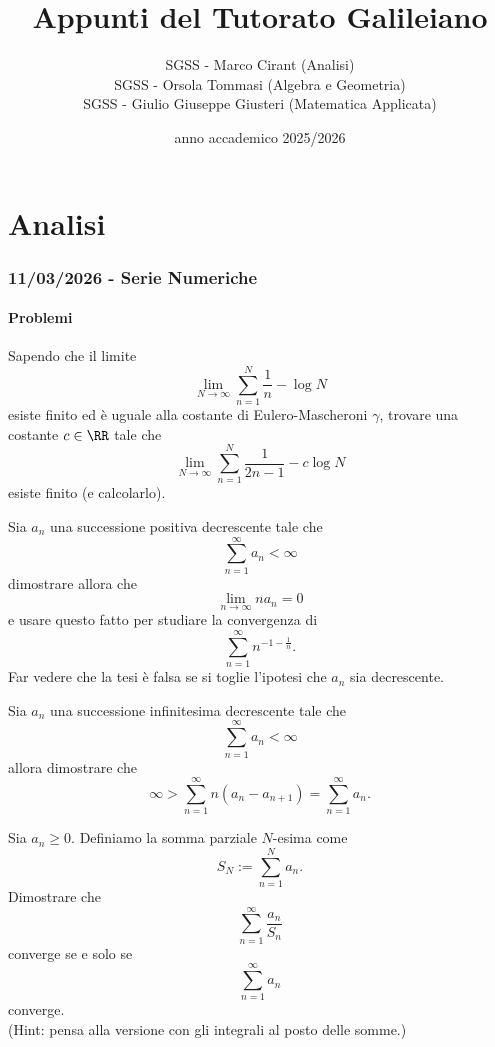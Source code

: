 \documentclass[11pt]{scrartcl}
\begin{document}
	\title{Appunti del Tutorato Galileiano}
	\subtitle{
		SGSS - Marco Cirant (Analisi)\\
		SGSS - Orsola Tommasi (Algebra e Geometria)\\
		SGSS - Giulio Giuseppe Giusteri (Matematica Applicata)
	}
	\date{anno accademico 2025/2026}
	
	\maketitle
	
	\tableofcontents
	
	\newpage
	\part{Analisi}
	\section{11/03/2026 - Serie Numeriche}
	\subsection{Problemi}
	
	\begin{problem}
		Sapendo che il limite 
		$$\lim_{N\to\infty}\sum_{n=1}^{N}\frac{1}{n}-\log N$$
		esiste finito ed è uguale alla costante di Eulero-Mascheroni $\gamma$, trovare una costante $c\in \RR$ tale che
		$$\lim_{N\to\infty}\sum_{n=1}^N\frac{1}{2n-1}-c\log N$$
		esiste finito (e calcolarlo). 
	\end{problem}
	\begin{problem}
		Sia $a_n$ una successione positiva decrescente tale che 
		$$\sum_{n=1}^\infty a_n < \infty$$
		dimostrare allora che 
		$$\lim_{n\to\infty}na_n=0$$
		e usare questo fatto per studiare la convergenza di 
		$$\sum_{n=1}^\infty n^{-1-\frac{1}{n}}.$$
		Far vedere che la tesi è falsa se si toglie l'ipotesi che $a_n$ sia decrescente.
	\end{problem}
	\begin{problem}
		Sia $a_n$ una successione infinitesima decrescente tale che 
		$$\sum_{n=1}^\infty a_n < \infty$$
		allora dimostrare che 
		$$\infty>\sum_{n=1}^\infty n(a_n-a_{n+1})=\sum_{n=1}^\infty a_n.$$ 
	\end{problem}
	\begin{problem}
		Sia $a_n\ge 0$. Definiamo la somma parziale $N$-esima come
		$$S_N:=\sum_{n=1}^N a_n.$$
		Dimostrare che 
		$$\sum_{n=1}^\infty \frac{a_n}{S_n}$$
		converge se e solo se 
		$$\sum_{n=1}^\infty a_n$$
		converge. \\
		(Hint: pensa alla versione con gli integrali al posto delle somme.)
	\end{problem}
	\newpage
	
\end{document}
